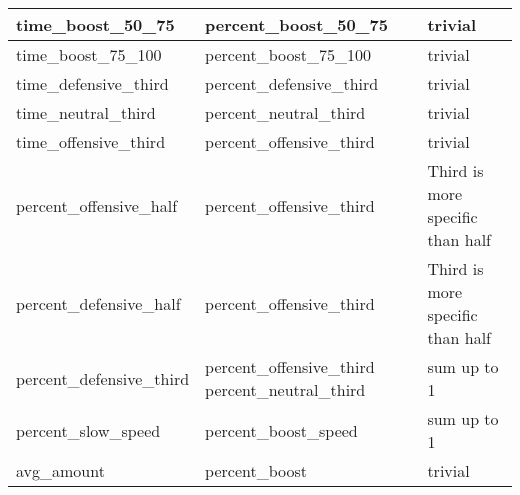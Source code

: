 \begin{table}[]
\begin{tabular}{|l|l|l|}
    time\_boost\_50\_75        & percent\_boost\_50\_75                              & trivial                                                                                                                    \\ \hline
    time\_boost\_75\_100       & percent\_boost\_75\_100                             & trivial                                                                                                                    \\ \hline
    time\_defensive\_third     & percent\_defensive\_third                           & trivial                                                                                                                    \\ \hline
    time\_neutral\_third       & percent\_neutral\_third                             & trivial                                                                                                                    \\ \hline
    time\_offensive\_third     & percent\_offensive\_third                           & trivial                                                                                                                    \\ \hline
    percent\_offensive\_half   & percent\_offensive\_third                           & Third is more specific than half                                                                                           \\ \hline
    percent\_defensive\_half   & percent\_offensive\_third                           & Third is more specific than half                                                                                           \\ \hline
    percent\_defensive\_third  & percent\_offensive\_third   percent\_neutral\_third & sum up to 1                                                                                                                \\ \hline
    percent\_slow\_speed       & percent\_boost\_speed                               & sum up to 1                                                                                                                \\ \hline
    avg\_amount                & percent\_boost                                      & trivial                                                                                                                    \\ \hline

\end{tabular}
\end{table}

